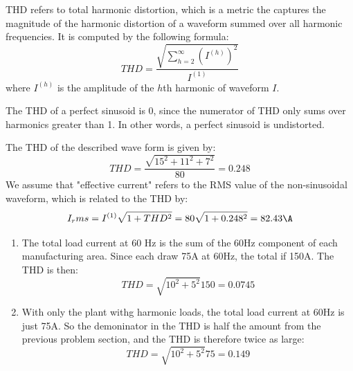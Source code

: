 \documentclass{homework}
\begin{document}
\begin{letterenum}
    \item THD refers to total harmonic distortion, which is a metric the captures
        the magnitude of the harmonic distortion of a waveform summed over all
        harmonic frequencies.  It is computed by the following formula:
        \begin{equation*}
            THD = \frac{\sqrt{\sum_{h=2}^{\infty} (I^{(h)})^2}}{I^{(1)}}
        \end{equation*}
        where $I^{(h)}$ is the amplitude of the $h$th harmonic of waveform $I$.
    
    \item The THD of a perfect sinusoid is 0, since the numerator of THD only sums
        over harmonics greater than 1. In other words, a perfect sinusoid is undistorted.
    
    \item The THD of the described wave form is given by:
    \begin{equation*}
        THD = \frac{\sqrt{15^2 + 11^2 + 7^2} }{80} = 0.248
    \end{equation*}
    We assume that "effective current" refers to the RMS value of the
    non-sinusoidal waveform, which is related to the THD by:
    \begin{equation*}
        I_rms = I^{(1)} \sqrt{1 + THD^2} = 80 \sqrt{1 + 0.248^2} = 82.43 \A
    \end{equation*}

    \item
    \begin{enumerate}
        \item The total load current at 60 Hz is the sum of the 60Hz component
            of each manufacturing area. Since each draw 75A at 60Hz, the total
            if 150A. The THD is then:
            \begin{equation*}
                THD = \sqrt{10^2 + 5^2}{150} = 0.0745
            \end{equation*}
        \item With only the plant withg harmonic loads, the total load current
            at 60Hz is just 75A. So the demoninator in the THD is half the amount
            from the previous problem section, and the THD is therefore twice
            as large:
            \begin{equation*}
                THD = \sqrt{10^2 + 5^2}{75} = 0.149
            \end{equation*}
    \end{enumerate}

        
\end{letterenum}
\end{document}
